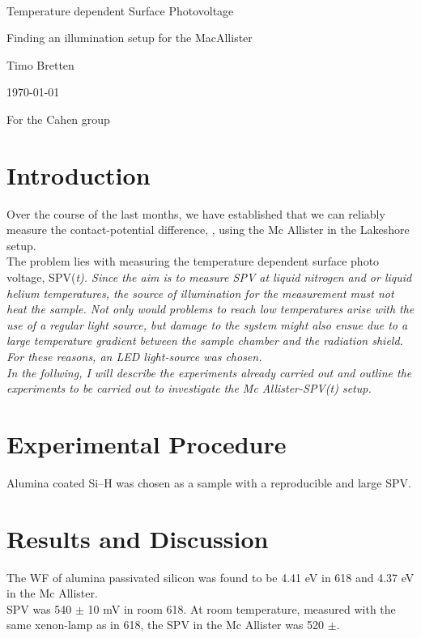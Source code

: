 \documentclass[a4paper,10pt]{article}
\newcommand{\mktit}{
	\thispagestyle{empty}
	\begin{center}
	\hrulefill \\
	\begin{huge}Temperature dependent Surface Photovoltage \\ \end{huge} 
	\begin{Large}Finding an illumination setup for the MacAllister  \\ \end{Large} \vspace*{0.8cm}

	\begin{large}Timo Bretten  \\\end{large} \vspace*{1.2cm}	
	
	\today \\ \vspace*{0.8cm}
	\begin{LARGE}For the Cahen group\\\end{LARGE}
	
	\end{center}
	\newpage
	\setcounter{page}{2}
}
\newcommand{\sih}{Si--H}
\newcommand{\cpd}{\text{CPD}}
\newcommand{\McA}{Mc Allister}
\newcommand{\spvt}{SPV(\it{t})}
\newcommand{\spv}{SPV}
\newcommand{\wf}{WF}
\begin{document}
\mktit
\section{Introduction}
Over the course of the last months, we have established that we can reliably measure the contact-potential difference, \cpd{}, using the \McA{} in the Lakeshore setup.\\
The problem lies with measuring the temperature dependent surface photo voltage, \spvt{}. Since the aim is to measure \spv{} at liquid nitrogen and or liquid helium temperatures, the source of illumination for the measurement must not heat the sample. Not only would problems to reach low temperatures arise with the use of a regular light source, but damage to the system might also ensue due to a large temperature gradient between the sample chamber and the radiation shield.\\
For these reasons, an LED light-source was chosen. \\
In the follwing, I will describe the experiments already carried out and outline the experiments to be carried out to investigate the \McA{}-\spvt{} setup.
\section{Experimental Procedure}
Alumina coated \sih{} was chosen as a sample with a reproducible and large \spv{}.
\section{Results and Discussion}
The \wf{} of alumina passivated silicon was found to be 4.41 eV in 618 and 4.37 eV in the \McA{}. \\
\spv{} was 540 $\pm$ 10 mV in room 618. At room temperature, measured with the same xenon-lamp as in 618, the \spv{} in the \McA{} was 520 $\pm$.\\
\end{document}
